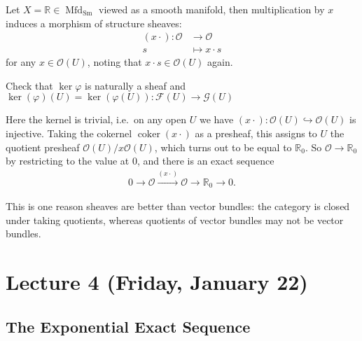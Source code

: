 \begin{example}[of morphisms]

Let \(X = {\mathbb{R}}\in {\operatorname{Mfd}}_{\operatorname{Sm}}\)
viewed as a smooth manifold, then multiplication by \(x\) induces a
morphism of structure sheaves:
\begin{align*}
(x \cdot): {\mathcal{O}}&\to {\mathcal{O}}\\
s & \mapsto x\cdot s
\end{align*}
for any \(x\in {\mathcal{O}}(U)\), noting that
\(x\cdot s\in {\mathcal{O}}(U)\) again.

\begin{exercise}[?]

Check that \(\ker \varphi\) is naturally a sheaf and
\(\ker(\varphi)(U) = \ker (\varphi(U)): \mathcal{F}(U) \to \mathcal{G}(U)\)

\end{exercise}

Here the kernel is trivial, i.e.~on any open \(U\) we have
\((x\cdot):{\mathcal{O}}(U) \hookrightarrow{\mathcal{O}}(U)\) is
injective. Taking the cokernel \(\operatorname{coker}(x\cdot)\) as a
presheaf, this assigns to \(U\) the quotient presheaf
\({\mathcal{O}}(U) / x{\mathcal{O}}(U)\), which turns out to be equal to
\({\mathbb{R}}_0\). So \({\mathcal{O}}\to {\mathbb{R}}_0\) by
restricting to the value at \(0\), and there is an exact sequence
\begin{align*}
0 \to {\mathcal{O}}\xrightarrow{(x\cdot)} {\mathcal{O}}\to {\mathbb{R}}_0 \to 0
.\end{align*}

This is one reason sheaves are better than vector bundles: the category
is closed under taking quotients, whereas quotients of vector bundles
may not be vector bundles.

\end{example}

\hypertarget{lecture-4-friday-january-22}{%
\section{Lecture 4 (Friday, January
22)}\label{lecture-4-friday-january-22}}

\hypertarget{the-exponential-exact-sequence}{%
\subsection{The Exponential Exact
Sequence}\label{the-exponential-exact-sequence}}

